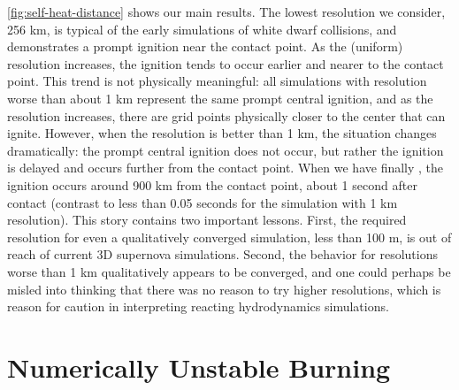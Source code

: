 \documentclass[twocolumn,numberedappendix,trackchanges]{../aastex62}
\begin{document}
\autoref{fig:self-heat-distance} shows our main results. The lowest resolution we consider,
256 km, is typical of the early simulations of white dwarf collisions, and demonstrates a
prompt ignition near the contact point. As the (uniform) resolution increases, the ignition
tends to occur earlier and nearer to the contact point. This trend is not physically meaningful:
all simulations with resolution worse than about 1 km represent the same prompt central ignition,
and as the resolution increases, there are grid points physically closer to the center that can ignite.
However, when the resolution is better than 1 km, the situation changes dramatically: the prompt
central ignition does not occur, but rather the ignition is delayed and occurs further from the contact
point. When we have finally , 
the ignition occurs around 900 km from the contact point, about 1 second after contact (contrast to less than
0.05 seconds for the simulation with 1 km resolution).  This story contains two important lessons. First,
the required resolution for even a qualitatively converged simulation, less than 100 m, is out of reach
of current 3D supernova simulations. Second, the behavior for resolutions worse than 1 km qualitatively
appears to be converged, and one could perhaps be misled into thinking that there was no reason to
try higher resolutions, which is reason for caution in interpreting reacting hydrodynamics simulations.



\section{Numerically Unstable Burning}
\label{sec:unstable_burning}
\end{document}
